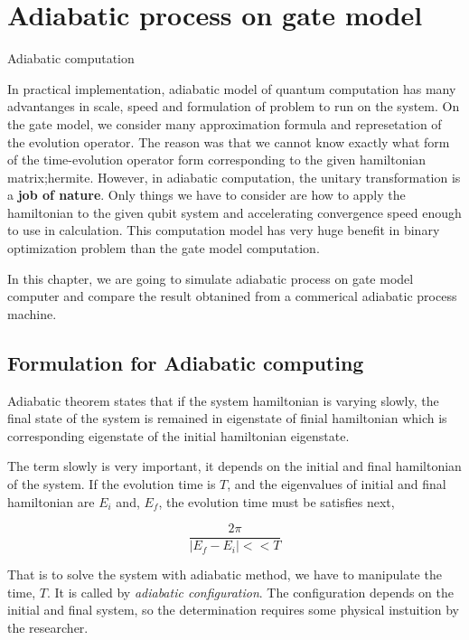 \chapter{Adiabatic process on gate model}

Adiabatic computation


In practical implementation, adiabatic model of quantum computation
has many advantanges in scale, speed and formulation of problem to run on the system.
On the gate model, we consider many approximation formula and represetation of the evolution operator. 
The reason was that we cannot know exactly what form of the time-evolution operator form corresponding to the given hamiltonian matrix;hermite. 
However, in adiabatic computation, the unitary transformation is a \textbf{job of nature}. 
Only things we have to consider are how to apply the hamiltonian to the given qubit system and 
accelerating convergence speed enough to use in calculation.
This computation model has very huge benefit in binary optimization problem than the gate model computation.

In this chapter, we are going to simulate adiabatic
process on gate model computer and compare the result obtanined
from a commerical adiabatic process machine.

\section{Formulation for Adiabatic computing}

Adiabatic theorem states that if the system hamiltonian is varying slowly, 
the final state of the system is remained in eigenstate of finial hamiltonian 
which is corresponding eigenstate of the initial hamiltonian eigenstate.

The term slowly is very important, it depends on the initial and final hamiltonian of the system. 
If the evolution time is $T$, and the eigenvalues of initial and final hamiltonian are $E_i$
and, $E_f$, the evolution time must be satisfies next,

\begin{equation}
    \frac{2 \pi}{|E_f - E_i| << T}
\end{equation}

That is to solve the system with adiabatic method, we have to manipulate the time, $T$.
It is called by \textit{adiabatic configuration}. 
The configuration depends on the initial and final system, 
so the determination requires some physical instuition by the researcher.

